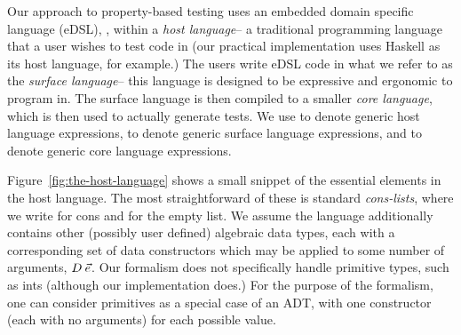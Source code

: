 


Our approach to property-based testing
uses an embedded domain specific language (eDSL), \ourDSL,
within a \textit{host language}-- 
a traditional programming language that a user wishes to test code in
(our practical implementation uses Haskell as its host language, for example.)
The users write eDSL code in what we refer to as the \textit{surface language}--
this language is designed to be expressive and ergonomic to program in.
The surface language is then compiled to a smaller \textit{core language},
which is then used to actually generate tests.
We use \expr to denote generic host language expressions,
\surface to denote generic surface language expressions,
and \core to denote generic core language expressions.


Figure~\ref{fig:the-host-language}
shows a small snippet of the essential elements in the host language.
The most straightforward of these is
standard \textit{cons-lists},
where we write \ccons for cons and \nil for the empty list.
We assume the language additionally contains
other (possibly user defined) algebraic data types,
each with a corresponding set of data constructors
which may be applied to some number of arguments,
$D\>\vec{e}$.
Our formalism does not specifically handle primitive types, such as ints
(although our implementation does.)
For the purpose of the formalism, 
one can consider primitives
as a special case of
an ADT,
with one constructor
(each with no arguments)
for each possible value.

